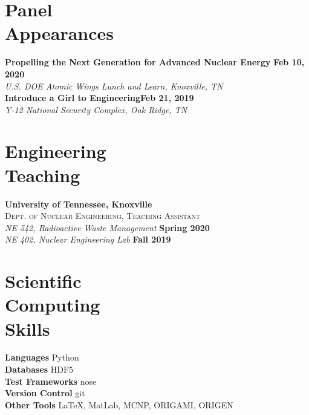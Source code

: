 \documentclass[margin,line]{resume}
\begin{document}
\begin{resume}
    \section{\mysidestyle Panel\\Appearances}
    \textbf{Propelling the Next Generation for Advanced Nuclear Energy} \hfill \textbf{Feb 10, 2020} \\
        \textsl{U.S. DOE Atomic Wings Lunch and Learn, Knoxville, TN} \\
    \textbf{Introduce a Girl to Engineering}\hfill \textbf{Feb 21, 2019} \\
        \textsl{Y-12 National Security Complex, Oak Ridge, TN} 
    \section{\mysidestyle Engineering\\Teaching}
    \textbf{University of Tennessee, Knoxville}\\
    \textsc{Dept. of Nuclear Engineering, Teaching Assistant}\\
               \textsl{NE 542, Radioactive Waste Management} \hfill \textbf{Spring 2020}\\
               \textsl{NE 402, Nuclear Engineering Lab} \hfill \textbf{Fall 2019}
               \vspace{2mm}
    \section{\mysidestyle Scientific\\Computing\\Skills}
                \textbf{Languages} \hfill Python \vspace{.5mm}\\%
                \textbf{Databases} \hfill HDF5 \vspace{.5mm}\\%
                \textbf{Test Frameworks} \hfill nose\vspace{.5mm}\\%
                \textbf{Version Control} \hfill git \vspace{.5mm}\\%
                \textbf{Other Tools} \hfill \LaTeX, MatLab, MCNP, ORIGAMI, ORIGEN \vspace{.5mm}%

\end{resume}
\end{document}
